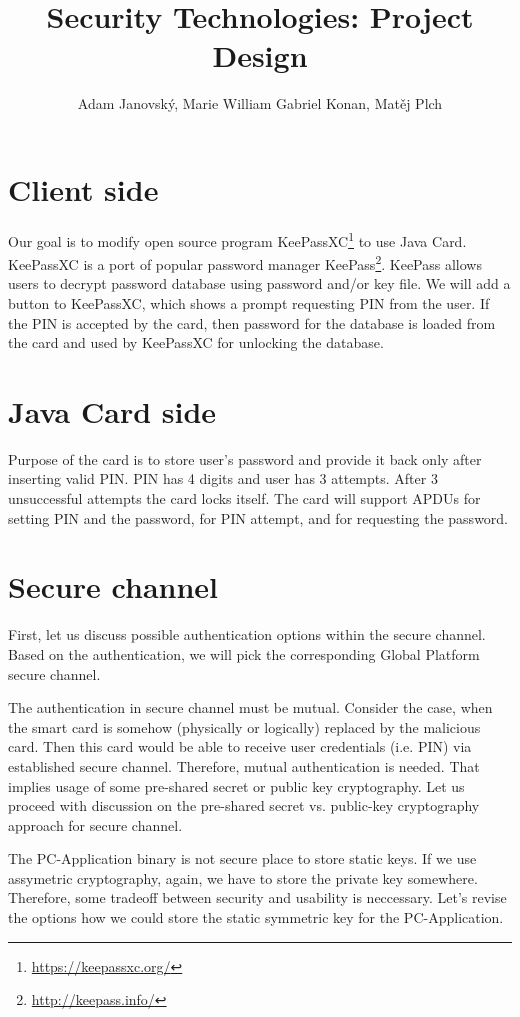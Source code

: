 \documentclass[12pt,a4paper]{article}
\title{Security Technologies: Project Design}
\author{Adam Janovský, Marie William Gabriel Konan, Matěj Plch}
\date{}
\begin{document}
\maketitle

\section{Client side}
Our goal is to modify open source program KeePassXC\footnote{\url{https://keepassxc.org/}} to use Java Card. KeePassXC is a port of popular password manager KeePass\footnote{\url{http://keepass.info/}}. KeePass allows users to decrypt password database using password and/or key file. We will add a button to KeePassXC, which shows a prompt requesting PIN from the user. If the PIN is accepted by the card, then password for the database is loaded from the card and used by KeePassXC for unlocking the database.

\section{Java Card side}
Purpose of the card is to store user's password and provide it back only after inserting valid PIN. PIN has 4 digits and user has 3 attempts. After 3 unsuccessful attempts the card locks itself. The card will support APDUs for setting PIN and the password, for PIN attempt, and for requesting the password.

\section{Secure channel}
First, let us discuss possible authentication options within the secure channel. Based on the authentication, we will pick the corresponding Global Platform secure channel.

The authentication in secure channel must be mutual. Consider the case, when the smart card is somehow (physically or logically) replaced by the malicious card. Then this card would be able to receive user credentials (i.e. PIN) via established secure channel. Therefore, mutual authentication is needed. That implies usage of some pre-shared secret or public key cryptography. Let us proceed with discussion on the pre-shared secret vs. public-key cryptography approach for secure channel. 

The PC-Application binary is not secure place to store static keys. If we use assymetric cryptography, again, we have to store the private key somewhere. 
Therefore, some tradeoff between security and usability is neccessary. Let's revise the options how we could store the static symmetric key for the PC-Application.
\end{document}
